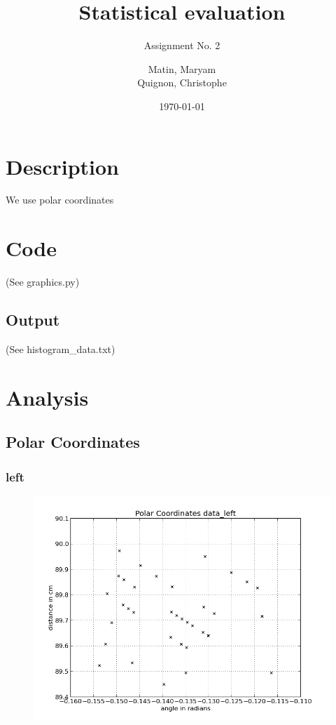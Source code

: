 \documentclass{scrartcl}
\begin{document}
\title{Statistical evaluation}
\subtitle{Assignment No. 2}
\author{
  Matin, Maryam \\
  Quignon, Christophe
}
\date{\today}


\maketitle

\section{Description}
We use polar coordinates

\section{Code}
(See graphics.py)


\subsection{Output}
(See histogram\_data.txt)


\section{Analysis}


\subsection{Polar Coordinates}


\subsubsection{left}
\begin{figure}[H]
  \centering
  \includegraphics[width=0.5\linewidth]{img/data_left_pc.png}
\end{figure}
\end{document}
